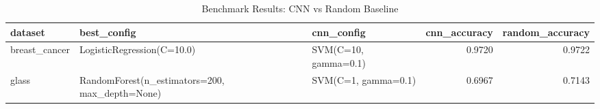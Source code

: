 \begin{table}
\caption{Benchmark Results: CNN vs Random Baseline}
\begin{tabular}{lllrr}
\toprule
dataset & best_config & cnn_config & cnn_accuracy & random_accuracy \\
\midrule
breast_cancer & LogisticRegression(C=10.0) & SVM(C=10, gamma=0.1) & 0.9720 & 0.9722 \\
glass & RandomForest(n_estimators=200, max_depth=None) & SVM(C=1, gamma=0.1) & 0.6967 & 0.7143 \\
\bottomrule
\end{tabular}
\end{table}
